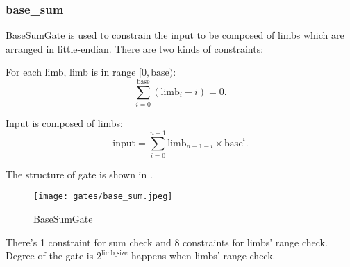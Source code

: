 \subsubsection{base\_sum}

BaseSumGate is used to constrain the input to be composed of limbs which are arranged in little-endian. There are two kinds of constraints:

For each limb, limb is in range $[0, \text{base})$:
\[ \sum_{i=0}^{\text{base}}(\text{limb}_i - i) = 0. \]

Input is composed of limbs:
\[ \text{input} = \sum_{i=0}^{n-1} \text{limb}_{n-1-i} \times \text{base}^i. \]

The structure of gate is shown in .
\begin{figure}[!ht]
    \centering
    \texttt{[image: gates/base\_sum.jpeg]}
    \caption{BaseSumGate}
    \label{fig:base-sum}
\end{figure}

There's 1 constraint for sum check and 8 constraints for limbs' range check. Degree of the gate is $2^{\text{limb\_size}}$ happens when limbs' range check.
